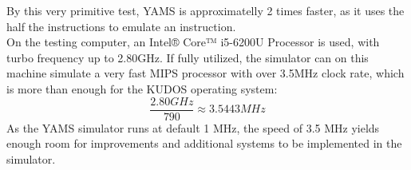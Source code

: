 %
%
%
%
%

By this very primitive test, YAMS is approximatelly 2 times faster, as it uses
the half the instructions to emulate an instruction.\\
On the testing computer, an Intel® Core™ i5-6200U Processor is used, with turbo
frequency up to 2.80GHz\cite{intel:i5}. If fully utilized, the simulator can on
this machine simulate a very fast MIPS processor with over 3.5MHz clock rate,
which is more than enough for the KUDOS operating system:
$$\frac{2.80\mathit{ GHz}}{790} \approx 3.5443\mathit{ MHz}$$
As the YAMS simulator runs at default 1 MHz\cite{yams}, the speed of 3.5 MHz yields enough
room for improvements and additional systems to be implemented in the simulator.
